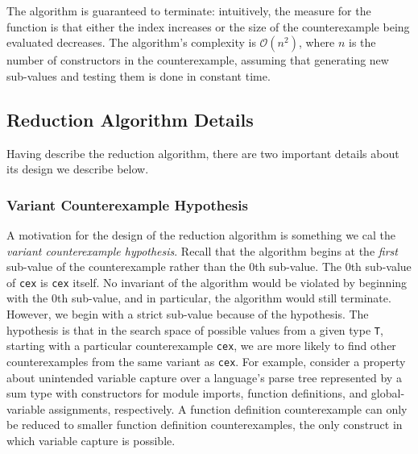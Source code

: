 \documentclass{sigplanconf}
\newenvironment{code}{\begin{alltt}}{\end{alltt}}
\newcommand{\ttp}[1]{\texttt{#1}}
\begin{document}
The algorithm is guaranteed to terminate: intuitively, the measure for the
function is that either the index increases or the size of the counterexample
being evaluated decreases.  The algorithm's complexity is
$\mathcal{O}(n^2)$, where $n$ is the number of constructors in the
counterexample, assuming that generating new sub-values and testing them is done
in constant time.

\subsection{Reduction Algorithm Details}
Having describe the reduction algorithm, there are two important details about
its design we describe below.

\subsubsection{Variant Counterexample Hypothesis}
A motivation for the design of the reduction algorithm is something we cal the
\emph{variant counterexample hypothesis}.  Recall that the algorithm begins at
the \emph{first} sub-value of the counterexample rather than the 0th sub-value.
The 0th sub-value of \ttp{cex} is \ttp{cex} itself.  No invariant of the
algorithm would be violated by beginning with the 0th sub-value, and in
particular, the algorithm would still terminate.  However, we begin with a
strict sub-value because of the hypothesis.  The hypothesis is that in the
search space of possible values from a given type \ttp{T}, starting with a
particular counterexample \ttp{cex}, we are more likely to find other
counterexamples from the same variant as \ttp{cex}.  For example, consider a
property about unintended variable capture over a language's parse tree
represented by a sum type with constructors for module imports, function
definitions, and global-variable assignments, respectively.  A function
definition counterexample can only be reduced to smaller function definition
counterexamples, the only construct in which variable capture is possible.


\end{document}
